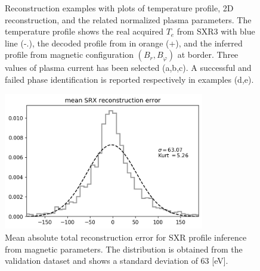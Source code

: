 \begin{figure}

\caption{Reconstruction examples with plots of temperature profile, 2D reconstruction, and the related normalized plasma parameters. The temperature profile shows the real acquired $T_e$ from SXR3 with blue line (-.), the decoded profile from  in orange (+), and the inferred profile from magnetic configuration $(B_r, B_\varphi)$ at border. Three values of plasma current has been selected (a,b,c). A successful and failed phase identification is reported respectively in examples (d,e). }
\label{fig:Step_12_val}
\end{figure}




\begin{figure}
    \centering
    \includegraphics[height=6cm]{img/STEP12_7c/Mean_Absolute_Error.png}
    \caption{Mean absolute total reconstruction error for SXR profile inference from magnetic parameters. The distribution is obtained from the validation dataset and shows a standard deviation of 63 [eV]. }
    \label{fig:my_label}
\end{figure}


